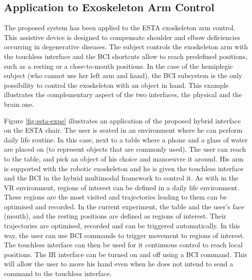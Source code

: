 
\subsection{Application to Exoskeleton Arm Control}
\label{sec:estares}

The proposed system has been applied to the ESTA exoskeleton arm control.
This assistive device is designed to compensate shoulder and elbow deficiencies occurring in degenerative diseases.
The subject controls the exoskeleton arm with the touchless interface and the BCI shortcuts allow to reach predefined positions, such as a resting or a close-to-mouth positions.
In the case of the hemiplegic subject (who cannot use her left arm and hand), the BCI subsystem is the only possibility to control the exoskeleton with an object in hand.
This example illustrates the complementary aspect of the two interfaces, the physical and the brain one.

Figure \ref{fig:esta-expe} illustrates an application of the proposed hybrid interface on the ESTA chair.
The user is seated in an environment where he can perform daily life routine. 
In this case, next to a table where a phone and a glass of water are placed on (to represent objects that are commonly used).
The user can reach to the table, and pick an object of his choice and manoeuvre it around. His arm is supported with the robotic exoskeleton and he is given the touchless interface and the BCI in the hybrid multimodal framework to control it.   
As with in the VR environment, regions of interest can be defined in a daily life environment. 
These regions are the most visited and trajectories leading to them can be optimised and recorded. 
In the current experiment, the table and the user's face (mouth), and the resting positions are defined as regions of interest. 
Their trajectories are optimised, recorded and can be triggered automatically.
In this way, the user can use BCI commands to trigger movement to regions of interest. 
The touchless interface can then be used for it continuous control to reach local positions.
The IR interface can be turned on and off using a BCI command. 
This will allow the user to move his hand even when he does not intend to send a command to the touchless interface.  

